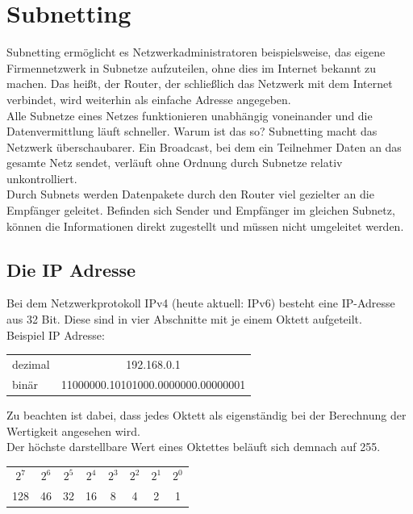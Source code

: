 \documentclass[12pt,a4paper]{article}
\begin{document}
\section{Subnetting}
Subnetting ermöglicht es Netzwerkadministratoren beispielsweise, das eigene Firmennetzwerk in Subnetze aufzuteilen, ohne dies im Internet bekannt zu machen. Das heißt, der Router, der schließlich das Netzwerk mit dem Internet verbindet, wird weiterhin als einfache Adresse angegeben.\vspace{.2cm}\\
Alle Subnetze eines Netzes funktionieren unabhängig voneinander und die Datenvermittlung läuft schneller. Warum ist das so? Subnetting macht das Netzwerk überschaubarer. Ein Broadcast, bei dem ein Teilnehmer Daten an das gesamte Netz sendet, verläuft ohne Ordnung durch Subnetze relativ unkontrolliert.\vspace{.2cm}\\
Durch Subnets werden Datenpakete durch den Router viel gezielter an die Empfänger geleitet. Beﬁnden sich Sender und Empfänger im gleichen Subnetz, können die Informationen direkt zugestellt und müssen nicht umgeleitet werden.
\subsection{Die IP Adresse}
Bei dem Netzwerkprotokoll IPv4 (heute aktuell: IPv6) besteht eine IP-Adresse aus 32 Bit. Diese sind in vier Abschnitte mit je einem Oktett aufgeteilt.\\
Beispiel IP Adresse:
\begin{center}
\renewcommand{\arraystretch}{1.5}
\begin{tabularx}{10cm}{lc}
dezimal&192.168.0.1 \\
binär&11000000.10101000.0000000.00000001 \\
\end{tabularx}
\end{center}
Zu beachten ist dabei, dass jedes Oktett als eigenständig bei der Berechnung der Wertigkeit angesehen wird.\\ Der höchste darstellbare Wert eines Oktettes beläuft sich demnach auf 255.
\begin{center}
\renewcommand{\arraystretch}{1.5}
\begin{tabularx}{6cm}{cccccccc}
$2^7$&$2^6$&$2^5$&$2^4$&$2^3$&$2^2$&$2^1$&$2^0$ \\
128&46&32&16&8&4&2&1 \\
\end{tabularx}
\end{center}
\newpage
\end{document}
